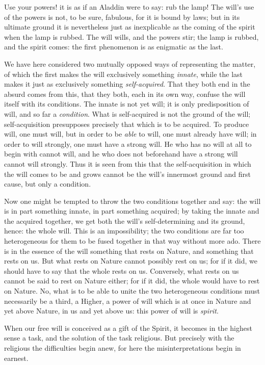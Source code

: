 \documentclass[12pt,a4paper,openany]{book}
\newcommand{\opage}[1]{\marginnote{\footnotesize\textit{[#1]}}}
\begin{document}
Use your powers! it is as if an Aladdin were to
say: rub the lamp! The will's use of the powers is
not, to be sure, fabulous, for it is bound by laws; but in
its ultimate ground it is nevertheless just as inexplicable as
the coming of the spirit when the lamp is rubbed. The will wills, and
the powers stir; the lamp is rubbed, and the spirit
comes: the first phenomenon is as enigmatic as the
last.

We have here considered two mutually opposed ways of representing the matter,
of which the first makes the will exclusively
something \emph{innate}, while the last makes it just as
exclusively something \emph{self-acquired}. That they
both end in the absurd comes from this, that they both, each
in its own way, confuse the will itself with its conditions.
The innate is not yet will; it is only predisposition of will,
and so far a \emph{condition}. What is self-acquired is not the
ground of the will; self-acquisition presupposes precisely that which
is to be acquired. To produce will, one must will, but
in order to be \emph{able} to will, one must already have will; in order
to will strongly, one must have a strong will. He
who has no will at all to begin with cannot will,
and he who does not beforehand have a strong will cannot
will strongly. Thus it is seen from this that the self-acquisition
in which the will comes to be and grows cannot be the will's
innermost ground and first cause, but only a condition.


Now one might be tempted to throw the two conditions
together and say: the will is in part something innate, in part
something acquired; by taking the innate and the acquired
together, we get both the will's self-determining
and its ground, hence: the whole will. This is an impossibility;
the two conditions are far too heterogeneous for them
to be fused together in that way without more ado. There
\setcounter{footnote}{0}%
\opage{8}is in the essence of the will something that rests on Nature,  and
something that rests on us. But what rests on Nature
cannot possibly rest on us; for if it did, we should have
to say that the whole rests on us. Conversely, what
rests on us cannot be said to rest on Nature either;
for if it did, the whole would have to
rest on Nature. No, what is to be able to unite
the two heterogeneous conditions must necessarily be a
third, a Higher, a power of will which is at once in Nature
and yet above Nature, in us and yet above us: this
power of will is \emph{spirit}.

When our free will is conceived as a gift of the Spirit, it becomes
in the highest sense a task, and the solution of the task
religious. But precisely with the religious the difficulties begin
anew, for here the misinterpretations begin in earnest.
\end{document}
